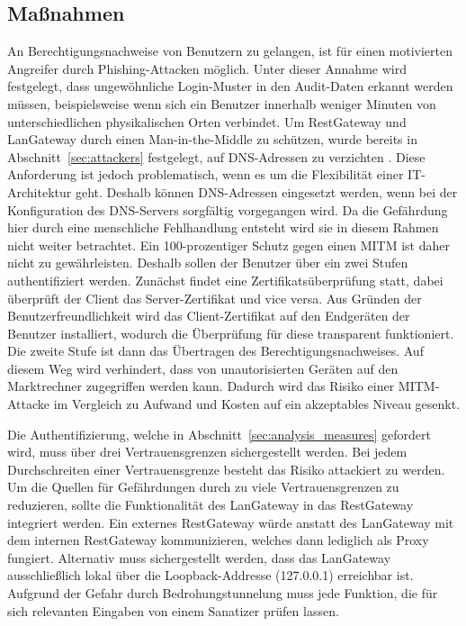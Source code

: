 \documentclass[11pt,a4paper]{report}
\begin{document}
\subsection{Maßnahmen}

An Berechtigungsnachweise von Benutzern zu gelangen, ist für einen motivierten Angreifer durch Phishing-Attacken möglich. Unter dieser Annahme wird festgelegt, dass ungewöhnliche Login-Muster in den Audit-Daten erkannt werden müssen, beispielsweise wenn sich ein Benutzer innerhalb weniger Minuten von unterschiedlichen physikalischen Orten verbindet. Um RestGateway und LanGateway durch einen Man-in-the-Middle zu schützen, wurde bereits in Abschnitt~\ref{sec:attackers} festgelegt, auf DNS-Adressen zu verzichten \cite{bsi_m5059}. Diese Anforderung ist jedoch problematisch, wenn es um die Flexibilität einer IT-Architektur geht. Deshalb können DNS-Adressen eingesetzt werden, wenn bei der Konfiguration des DNS-Servers sorgfältig vorgegangen wird. Da die Gefährdung hier durch eine menschliche Fehlhandlung entsteht wird sie in diesem Rahmen nicht weiter betrachtet. Ein 100-prozentiger Schutz gegen einen MITM ist daher nicht zu gewährleisten. Deshalb sollen der Benutzer über ein zwei Stufen authentifiziert werden. Zunächst findet eine Zertifikatsüberprüfung statt, dabei überprüft der Client das Server-Zertifikat und vice versa. Aus Gründen der Benutzerfreundlichkeit wird das Client-Zertifikat auf den Endgeräten der Benutzer installiert, wodurch die Überprüfung für diese transparent funktioniert. Die zweite Stufe ist dann das Übertragen des Berechtigungsnachweises. Auf diesem Weg wird verhindert, dass von unautorisierten Geräten auf den Marktrechner zugegriffen werden kann. Dadurch wird das Risiko einer MITM-Attacke im Vergleich zu Aufwand und Kosten auf ein akzeptables Niveau gesenkt. 

Die Authentifizierung, welche in Abschnitt~\ref{sec:analysis_measures} gefordert wird, muss über drei Vertrauensgrenzen sichergestellt werden. Bei jedem Durchschreiten einer Vertrauensgrenze besteht das Risiko attackiert zu werden. Um die Quellen für Gefährdungen durch zu viele Vertrauensgrenzen zu reduzieren, sollte die Funktionalität des LanGateway in das RestGateway integriert werden. Ein externes RestGateway würde anstatt des LanGateway mit dem internen RestGateway kommunizieren, welches dann lediglich als Proxy fungiert. Alternativ muss sichergestellt werden, dass das LanGateway ausschließlich lokal über die Loopback-Addresse (127.0.0.1) erreichbar ist. Aufgrund der Gefahr durch Bedrohungstunnelung muss jede Funktion, die für sich relevanten Eingaben von einem Sanatizer prüfen lassen.
\end{document}
